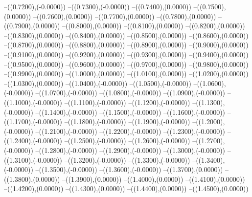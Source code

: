 {	--({\sx*(0.7200)},{\sy*(-0.0000)})
	--({\sx*(0.7300)},{\sy*(-0.0000)})
	--({\sx*(0.7400)},{\sy*(0.0000)})
	--({\sx*(0.7500)},{\sy*(0.0000)})
	--({\sx*(0.7600)},{\sy*(0.0000)})
	--({\sx*(0.7700)},{\sy*(0.0000)})
	--({\sx*(0.7800)},{\sy*(0.0000)})
	--({\sx*(0.7900)},{\sy*(0.0000)})
	--({\sx*(0.8000)},{\sy*(0.0000)})
	--({\sx*(0.8100)},{\sy*(0.0000)})
	--({\sx*(0.8200)},{\sy*(0.0000)})
	--({\sx*(0.8300)},{\sy*(0.0000)})
	--({\sx*(0.8400)},{\sy*(0.0000)})
	--({\sx*(0.8500)},{\sy*(0.0000)})
	--({\sx*(0.8600)},{\sy*(0.0000)})
	--({\sx*(0.8700)},{\sy*(0.0000)})
	--({\sx*(0.8800)},{\sy*(0.0000)})
	--({\sx*(0.8900)},{\sy*(0.0000)})
	--({\sx*(0.9000)},{\sy*(0.0000)})
	--({\sx*(0.9100)},{\sy*(0.0000)})
	--({\sx*(0.9200)},{\sy*(0.0000)})
	--({\sx*(0.9300)},{\sy*(0.0000)})
	--({\sx*(0.9400)},{\sy*(0.0000)})
	--({\sx*(0.9500)},{\sy*(0.0000)})
	--({\sx*(0.9600)},{\sy*(0.0000)})
	--({\sx*(0.9700)},{\sy*(0.0000)})
	--({\sx*(0.9800)},{\sy*(0.0000)})
	--({\sx*(0.9900)},{\sy*(0.0000)})
	--({\sx*(1.0000)},{\sy*(0.0000)})
	--({\sx*(1.0100)},{\sy*(0.0000)})
	--({\sx*(1.0200)},{\sy*(0.0000)})
	--({\sx*(1.0300)},{\sy*(0.0000)})
	--({\sx*(1.0400)},{\sy*(-0.0000)})
	--({\sx*(1.0500)},{\sy*(-0.0000)})
	--({\sx*(1.0600)},{\sy*(-0.0000)})
	--({\sx*(1.0700)},{\sy*(-0.0000)})
	--({\sx*(1.0800)},{\sy*(-0.0000)})
	--({\sx*(1.0900)},{\sy*(-0.0000)})
	--({\sx*(1.1000)},{\sy*(-0.0000)})
	--({\sx*(1.1100)},{\sy*(-0.0000)})
	--({\sx*(1.1200)},{\sy*(-0.0000)})
	--({\sx*(1.1300)},{\sy*(-0.0000)})
	--({\sx*(1.1400)},{\sy*(-0.0000)})
	--({\sx*(1.1500)},{\sy*(-0.0000)})
	--({\sx*(1.1600)},{\sy*(-0.0000)})
	--({\sx*(1.1700)},{\sy*(-0.0000)})
	--({\sx*(1.1800)},{\sy*(-0.0000)})
	--({\sx*(1.1900)},{\sy*(-0.0000)})
	--({\sx*(1.2000)},{\sy*(-0.0000)})
	--({\sx*(1.2100)},{\sy*(-0.0000)})
	--({\sx*(1.2200)},{\sy*(-0.0000)})
	--({\sx*(1.2300)},{\sy*(-0.0000)})
	--({\sx*(1.2400)},{\sy*(-0.0000)})
	--({\sx*(1.2500)},{\sy*(-0.0000)})
	--({\sx*(1.2600)},{\sy*(-0.0000)})
	--({\sx*(1.2700)},{\sy*(-0.0000)})
	--({\sx*(1.2800)},{\sy*(-0.0000)})
	--({\sx*(1.2900)},{\sy*(-0.0000)})
	--({\sx*(1.3000)},{\sy*(-0.0000)})
	--({\sx*(1.3100)},{\sy*(-0.0000)})
	--({\sx*(1.3200)},{\sy*(-0.0000)})
	--({\sx*(1.3300)},{\sy*(-0.0000)})
	--({\sx*(1.3400)},{\sy*(-0.0000)})
	--({\sx*(1.3500)},{\sy*(-0.0000)})
	--({\sx*(1.3600)},{\sy*(-0.0000)})
	--({\sx*(1.3700)},{\sy*(0.0000)})
	--({\sx*(1.3800)},{\sy*(0.0000)})
	--({\sx*(1.3900)},{\sy*(0.0000)})
	--({\sx*(1.4000)},{\sy*(0.0000)})
	--({\sx*(1.4100)},{\sy*(0.0000)})
	--({\sx*(1.4200)},{\sy*(0.0000)})
	--({\sx*(1.4300)},{\sy*(0.0000)})
	--({\sx*(1.4400)},{\sy*(0.0000)})
	--({\sx*(1.4500)},{\sy*(0.0000)})
}
